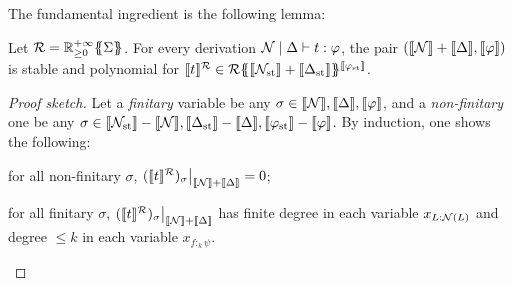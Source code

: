    The fundamental ingredient is the following lemma:
   
  \begin{lemma}\label{lemma:stability}
  Let $\mathcal{R}={\mathbb{R}^{+\infty}_{\geq 0}}\{\!\!\{\Sigma\}\!\!\}$.
For every derivation $\mathcal{N}\mid\Delta\vdash t:\varphi$, the pair $(\llbracket\mathcal{N}\rrbracket+\llbracket\Delta\rrbracket, \llbracket\varphi\rrbracket)$ is stable and polynomial for $\llbracket t\rrbracket^{\mathcal{R}}\in {\mathcal{R}}\{\!\!\{\llbracket{\mathcal{N}}_{\mathrm{st}}\rrbracket+\llbracket{\Delta}_{\mathrm{st}}\rrbracket\}\!\!\}^{\llbracket{\varphi}_{\mathrm{st}}\rrbracket}$.
  
  
  
  \end{lemma}
  \begin{proof}[Proof sketch]
  Let a \emph{finitary} variable be any $\sigma\in\llbracket\mathcal{N}\rrbracket,\llbracket\Delta\rrbracket,\llbracket\varphi\rrbracket$, and a \emph{non-finitary} one be any $\sigma\in\llbracket{\mathcal{N}}_{\mathrm{st}}\rrbracket-\llbracket\mathcal{N}\rrbracket,\llbracket{\Delta}_{\mathrm{st}}\rrbracket-\llbracket\Delta\rrbracket,\llbracket{\varphi}_{\mathrm{st}}\rrbracket-\llbracket\varphi\rrbracket$.
By induction, one shows the following:
   \begin{varenumerate} 
   \item for all non-finitary $\sigma$, $(\llbracket t\rrbracket^{\mathcal{R}})_\sigma\big\vert_{\llbracket\mathcal{N}\rrbracket+\llbracket\Delta\rrbracket}=0$;
   \item for all finitary $\sigma$, 
   $(\llbracket t\rrbracket^{\mathcal{R}})_\sigma\big\vert_{\llbracket\mathcal{N}\rrbracket+\llbracket\Delta\rrbracket}$ has 
   finite degree in each variable $x_{L:\mathcal{N}(L)}$ and 
   degree $\leq k$ in each variable $x_{f:_k\psi}$.
   \end{varenumerate}
   \vskip-4mm
   \end{proof}
%
